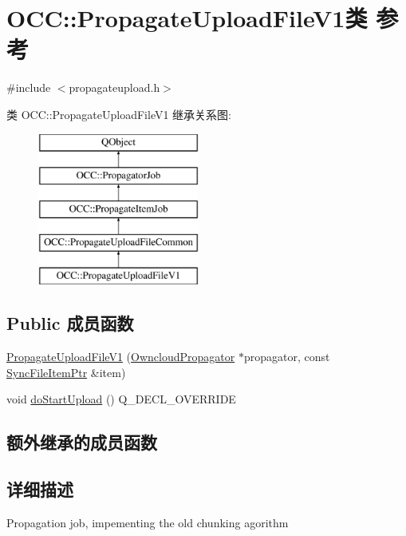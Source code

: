 \hypertarget{class_o_c_c_1_1_propagate_upload_file_v1}{}\section{O\+CC\+:\+:Propagate\+Upload\+File\+V1类 参考}
\label{class_o_c_c_1_1_propagate_upload_file_v1}


{\ttfamily \#include $<$propagateupload.\+h$>$}

类 O\+CC\+:\+:Propagate\+Upload\+File\+V1 继承关系图\+:\begin{figure}[H]
\begin{center}
\leavevmode
\includegraphics[height=5.000000cm]{class_o_c_c_1_1_propagate_upload_file_v1}
\end{center}
\end{figure}
\subsection*{Public 成员函数}
\begin{DoxyCompactItemize}
\item 
\hyperlink{class_o_c_c_1_1_propagate_upload_file_v1_ae48f44222bd5157777610d85a17272fa}{Propagate\+Upload\+File\+V1} (\hyperlink{class_o_c_c_1_1_owncloud_propagator}{Owncloud\+Propagator} $\ast$propagator, const \hyperlink{namespace_o_c_c_acb6b0db82893659fbd0c98d3c5b8e2b8}{Sync\+File\+Item\+Ptr} \&item)
\item 
void \hyperlink{class_o_c_c_1_1_propagate_upload_file_v1_ae868275c2eda03e0e6f83b1e9b8b5e54}{do\+Start\+Upload} () Q\+\_\+\+D\+E\+C\+L\+\_\+\+O\+V\+E\+R\+R\+I\+DE
\end{DoxyCompactItemize}
\subsection*{额外继承的成员函数}


\subsection{详细描述}
Propagation job, impementing the old chunking agorithm 

